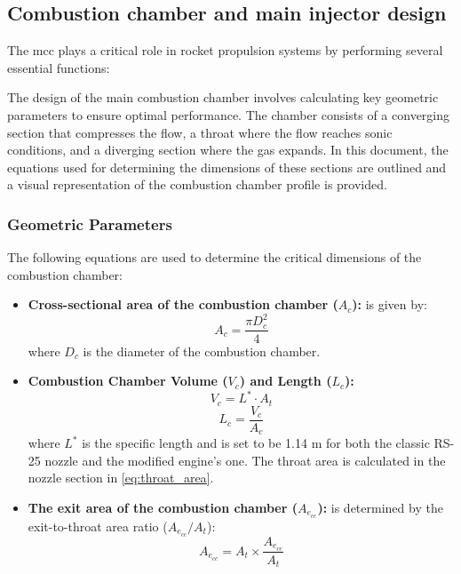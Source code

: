 \subsection{Combustion chamber and main injector design}
The \acrfull{mcc} plays a critical role in rocket propulsion systems by performing several essential functions:

The design of the main combustion chamber involves calculating key geometric parameters to ensure optimal performance. The chamber consists of a converging section that compresses the flow, a throat where the flow reaches sonic conditions, and a diverging section where the gas expands.
In this document, the equations used for determining the dimensions of these sections are outlined and a visual representation of the combustion chamber profile is provided.

\subsubsection{Geometric Parameters}

The following equations are used to determine the critical dimensions of the combustion chamber:

\begin{itemize}

\item\textbf{Cross-sectional area of the combustion chamber (\( A_c \)):}
is given by:
\begin{equation}
A_c = \frac{\pi D_c^2}{4}
\end{equation}
where \( D_c \) is the diameter of the combustion chamber.
     \item \textbf{Combustion Chamber Volume (\(V_c\)) and Length (\(L_c\)):}
            \begin{equation}
            V_c = L^* \cdot A_t
            \end{equation}
            \begin{equation}
            L_c = \frac{V_c}{A_c}
            \end{equation}
            where \(L^*\) is the specific length and is set to be 1.14 m for both the classic RS-25 nozzle and the modified engine's one.
            The throat area is calculated in the nozzle section in \cref{eq:throat_area}.

\item\textbf{The exit area of the combustion chamber (\( A_{e_{cc}} \)):}
is determined by the exit-to-throat area ratio (\( A_{e_{cc}}/A_t \)):
\begin{equation}
A_{e_{cc}} = A_t \times \frac{A_{e_{cc}}}{A_t}
\end{equation}
\end{itemize}

